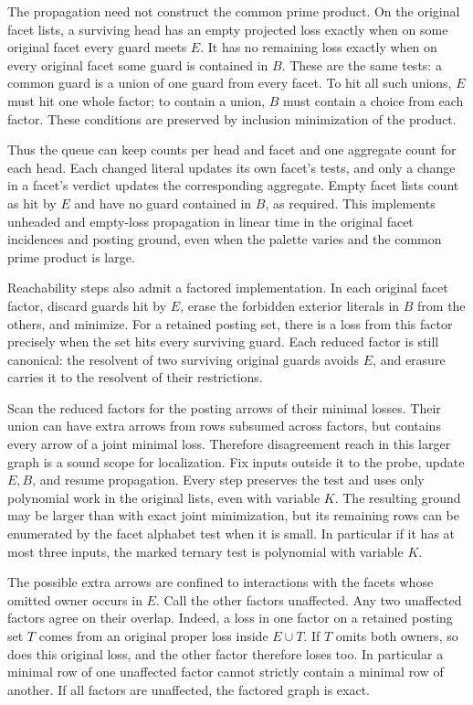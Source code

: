 The propagation need not construct the common
prime product. On the original facet lists, a
surviving head has an empty projected loss exactly
when on some original facet every guard meets $E$.
It has no remaining loss exactly when on every
original facet some guard is contained in $B$.
These are the same tests: a common guard is a
union of one guard from every facet. To hit
all such unions, $E$ must hit one whole factor;
to contain a union, $B$ must contain a choice
from each factor. These conditions are preserved
by inclusion minimization of the product.

Thus the queue can keep counts per head and
facet and one aggregate count for each head.
Each changed literal updates its own facet's
tests, and only a change in a facet's verdict
updates the corresponding aggregate. Empty
facet lists count as hit by $E$ and have no
guard contained in $B$, as required. This
implements unheaded and empty-loss propagation
in linear time in the original facet incidences
and posting ground, even when the palette
varies and the common prime product is large.

Reachability steps also admit a factored
implementation. In each original facet
factor, discard guards hit by $E$, erase
the forbidden exterior literals in $B$
from the others, and minimize. For a
retained posting set, there is a loss
from this factor precisely when the set
hits every surviving guard. Each reduced
factor is still canonical: the resolvent
of two surviving original guards avoids
$E$, and erasure carries it to the
resolvent of their restrictions.

Scan the reduced factors for the posting
arrows of their minimal losses. Their
union can have extra arrows from rows
subsumed across factors, but contains
every arrow of a joint minimal loss.
Therefore disagreement reach in this
larger graph is a sound scope for
localization. Fix inputs outside it
to the probe, update $E,B$, and resume
propagation. Every step preserves the
test and uses only polynomial work in
the original lists, even with variable
$K$. The resulting ground may be larger
than with exact joint minimization,
but its remaining rows can be enumerated
by the facet alphabet test when it is
small. In particular if it has at most
three inputs, the marked ternary test
is polynomial with variable $K$.

The possible extra arrows are confined to
interactions with the facets whose omitted
owner occurs in $E$. Call the other factors
unaffected. Any two unaffected factors
agree on their overlap. Indeed, a loss in
one factor on a retained posting set $T$
comes from an original proper loss inside
$E\cup T$. If $T$ omits both owners, so
does this original loss, and the other
factor therefore loses too. In particular
a minimal row of one unaffected factor
cannot strictly contain a minimal row
of another. If all factors are unaffected,
the factored graph is exact.

